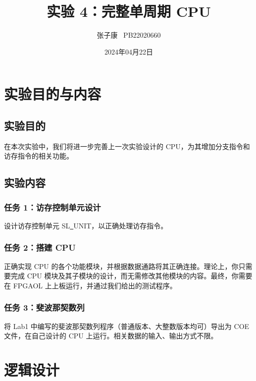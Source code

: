 \documentclass[12pt,a4paper]{ctexart}
\title{实验 4：完整单周期 CPU}
\author{张子康 \ PB22020660}
\date{2024年04月22日}
\begin{document}
\maketitle
\newpage
\section{实验目的与内容}
\subsection{实验目的}
在本次实验中，我们将进一步完善上一次实验设计的 CPU，为其增加分支指令和访存指令的相关功能。
\subsection{实验内容}
\subsubsection{任务 1：访存控制单元设计}
设计访存控制单元 SL\underline{~}UNIT，以正确处理访存指令。
\subsubsection{任务 2：搭建 CPU}
正确实现 CPU 的各个功能模块，并根据数据通路将其正确连接。理论上，你只需要完成 CPU 模块及其子模块的设计，而无需修改其他模块的内容。最终，你需要在 FPGAOL 上上板运行，并通过我们给出的测试程序。
\subsubsection{任务 3：斐波那契数列}
将 Lab1 中编写的斐波那契数列程序（普通版本、大整数版本均可）导出为 COE 文件，在自己设计的 CPU 上运行。相关数据的输入、输出方式不限。
\section{逻辑设计}
\end{document}
